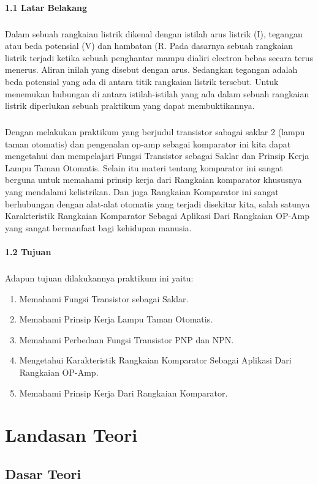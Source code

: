 \documentclass[12pt,a4paper]{article}
\begin{document}
\paragraph{1.1 Latar Belakang}
\subparagraph{ }
	Dalam sebuah rangkaian listrik dikenal dengan istilah arus listrik (I), tegangan atau beda potensial (V) dan hambatan (R. Pada dasarnya sebuah rangkaian listrik terjadi ketika sebuah penghantar mampu dialiri electron bebas secara terus menerus. Aliran inilah yang disebut dengan arus. Sedangkan tegangan adalah beda potensial yang ada di antara titik rangkaian listrik tersebut. Untuk menemukan hubungan di antara istilah-istilah yang ada dalam sebuah rangkaian listrik diperlukan sebuah praktikum yang dapat membuktikannya.
\subparagraph{ }
	Dengan melakukan praktikum yang berjudul transistor sabagai saklar 2 (lampu taman otomatis) dan pengenalan op-amp sebagai komparator ini kita dapat mengetahui dan mempelajari Fungsi Transistor sebagai Saklar dan Prinsip Kerja Lampu Taman Otomatis. Selain itu materi tentang komparator ini sangat berguna untuk memahami prinsip kerja dari Rangkaian komparator khususnya yang mendalami kelistrikan. Dan juga Rangkaian Komparator ini sangat berhubungan dengan alat-alat otomatis yang terjadi disekitar kita, salah satunya Karakteristik Rangkaian Komparator Sebagai Aplikasi Dari Rangkaian OP-Amp yang sangat bermanfaat bagi kehidupan manusia.
 

\paragraph{1.2 Tujuan}
\subparagraph{ }
Adapun tujuan dilakukannya praktikum ini yaitu:
\begin{enumerate}
\item Memahami Fungsi Transistor sebagai Saklar.
\item Memahami Prinsip Kerja Lampu Taman Otomatis.
\item Memahami Perbedaan Fungsi Transistor PNP dan NPN.
\item Mengetahui Karakteristik Rangkaian Komparator Sebagai Aplikasi Dari Rangkaian OP-Amp.
\item Memahami Prinsip Kerja Dari Rangkaian Komparator.
\end{enumerate}


\newpage
\section{Landasan Teori}
\subsection{Dasar Teori}
\end{document}
